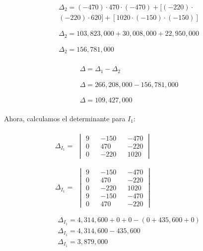 \documentclass[conference]{IEEEtran}
\begin{document}
\begin{align*}
  \begin{split}
    \Delta_2 = (-470) \cdot 470 \cdot (-470) + [(-220) \cdot \\
    (-220) \cdot 620] + [1020 \cdot (-150) \cdot (-150)]
  \end{split} \\ \\
  \begin{split}
    \Delta_2 = 103,823,000 + 30,008,000 + 22,950,000
  \end{split} \\ \\
  \begin{split}
    \Delta_2 = 156,781,000
  \end{split}
\end{align*}

\begin{align*}
  \begin{split}
    \Delta = \Delta_1 - \Delta_2
  \end{split} \\ \\
  \begin{split}
    \Delta = 266,208,000 - 156,781,000
  \end{split} \\ \\
  \begin{split}
    \Delta = 109,427,000
  \end{split}
\end{align*}

Ahora, calculamos el determinante para $I_1$:

\begin{align*}
  \Delta_{I_1} =
  \begin{split}
    \begin{vmatrix}
      9 && -150 && -470 \\
      0 && 470 && -220 \\
      0 && -220 && 1020
    \end{vmatrix}
  \end{split} \\ \\
  \Delta_{I_1} =
  \begin{split}
    \begin{vmatrix}
      9 && -150 && -470 \\
      0 &&  470 && -220 \\
      0 && -220 && 1020 \\
      9 && -150 && -470 \\
      0 &&  470 && -220
    \end{vmatrix}
  \end{split} \\ \\
  \begin{split}
    \Delta_{I_1} = 4,314,600 + 0 + 0 - (0 + 435,600 + 0) \\
    \Delta_{I_1} = 4,314,600 - 435,600 \\
    \Delta_{I_1} = 3,879,000
  \end{split}
\end{align*}
\end{document}
